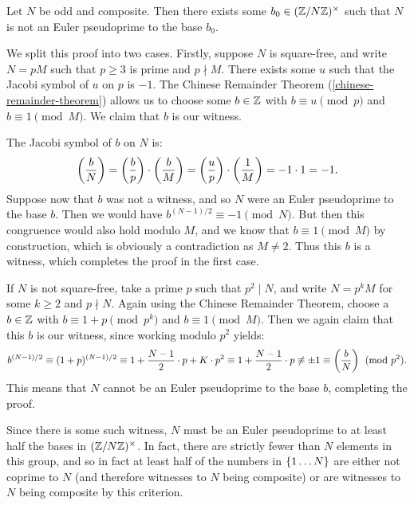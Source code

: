 \documentclass{article}
\begin{document}
\begin{proposition}
    Let $N$ be odd and composite. Then there exists some $b_0 \in (\mathbb{Z}/N\mathbb{Z})^\times$ such that $N$ is not an Euler pseudoprime to the base $b_0$.
\end{proposition}

\begin{prf}
    We split this proof into two cases. Firstly, suppose $N$ is square-free, and write $N = pM$ such that $p \geq 3$ is prime and $p \nmid M$. There exists some $u$ such that the Jacobi symbol of $u$ on $p$ is $-1$. The Chinese Remainder Theorem (\ref{chinese-remainder-theorem}) allows us to choose some $b \in \mathbb{Z}$ with $b \equiv u \pmod p$ and $b \equiv 1 \pmod M$. We claim that $b$ is our witness.
    
    The Jacobi symbol of $b$ on $N$ is:
    \[
	\left( \frac{b}{N} \right) = \left( \frac{b}{p} \right) \cdot \left( \frac{b}{M} \right) =
	\left( \frac{u}{p} \right) \cdot \left( \frac{1}{M} \right) =
	-1 \cdot 1 = -1.
	\]
	Suppose now that $b$ was not a witness, and so $N$ were an Euler pseudoprime to the base $b$. Then we would have $b^{(N-1)/2} \equiv -1 \pmod N$. But then this congruence would also hold modulo $M$, and we know that $b \equiv 1 \pmod M$ by construction, which is obviously a contradiction as $M \neq 2$. Thus this $b$ is a witness, which completes the proof in the first case.
	
	If $N$ is not square-free, take a prime $p$ such that $p^2 \mid N$, and write $N = p^k M$ for some $k \geq 2$ and $p \nmid N$. Again using the Chinese Remainder Theorem, choose a $b \in \mathbb{Z}$ with $b \equiv 1 + p \pmod{p^k}$ and $b \equiv 1 \pmod M$. Then we again claim that this $b$ is our witness, since working modulo $p^2$ yields:
	\[
	b^{(N-1)/2} \equiv (1 + p)^{(N-1)/2} \equiv
	1 + \frac{N-1}{2} \cdot p + K \cdot p^2 \equiv
	1 + \frac{N-1}{2} \cdot p
	\not\equiv \pm 1 \equiv \left( \frac{b}{N} \right)
	\pmod{p^2}.
	\]
	This means that $N$ cannot be an Euler pseudoprime to the base $b$, completing the proof.
\end{prf}

\begin{corollary}
    Since there is some such witness, $N$ must be an Euler pseudoprime to at least half the bases in $(\mathbb{Z}/N\mathbb{Z})^\times$. In fact, there are strictly fewer than $N$ elements in this group, and so in fact at least half of the numbers in $\left\lbrace 1 \dots N \right\rbrace$ are either not coprime to $N$ (and therefore witnesses to $N$ being composite) or are witnesses to $N$ being composite by this criterion.
\end{corollary}
\end{document}
